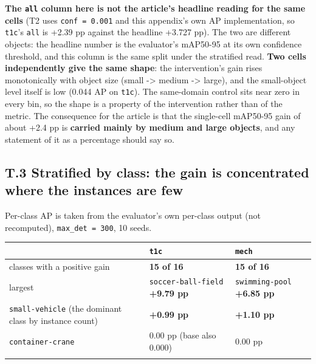 \documentclass[pdflatex,sn-mathphys-ay]{sn-jnl}
\begin{document}
\textbf{The \texttt{all} column here is not the article's headline reading for the same cells} (T2 uses \texttt{conf = 0.001} and this appendix's own AP implementation, so \texttt{t1c}'s \texttt{all} is +2.39 pp against the headline +3.727 pp). The two are different objects: the headline number is the evaluator's mAP50-95 at its own confidence threshold, and this column is the same split under the stratified read. \textbf{Two cells independently give the same shape}: the intervention's gain rises monotonically with object size (small -\textgreater{} medium -\textgreater{} large), and the small-object level itself is low (0.044 AP on \texttt{t1c}). The same-domain control sits near zero in every bin, so the shape is a property of the intervention rather than of the metric. The consequence for the article is that the single-cell mAP50-95 gain of about +2.4 pp is \textbf{carried mainly by medium and large objects}, and any statement of it as a percentage should say so.

\subsection*{T.3 Stratified by class: the gain is concentrated where the instances are few}

Per-class AP is taken from the evaluator's own per-class output (not recomputed), \texttt{max\_det = 300}, 10 seeds.

{\footnotesize
\setlength{\tabcolsep}{4pt}
\begin{longtable}{p{}p{}p{}}
\toprule
 & \texttt{t1c} & \texttt{mech} \\
\midrule
\endhead
classes with a positive gain & \textbf{15 of 16} & \textbf{15 of 16} \\
largest & \texttt{soccer-ball-field} \textbf{+9.79 pp} & \texttt{swimming-pool} \textbf{+6.85 pp} \\
\texttt{small-vehicle} (the dominant class by instance count) & \textbf{+0.99 pp} & \textbf{+1.10 pp} \\
\texttt{container-crane} & 0.00 pp (base also 0.000) & 0.00 pp \\
\botrule
\end{longtable}}
\end{document}
